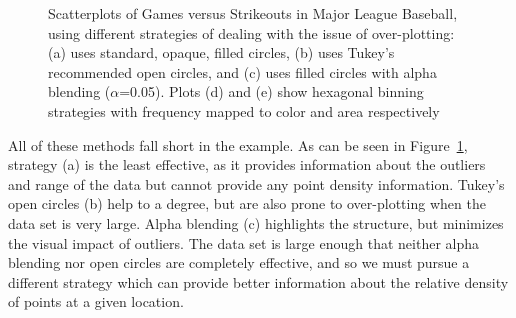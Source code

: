 \begin{figure}[hbtp]

	\caption{\label{fig:scatter-alpha} Scatterplots of Games versus Strikeouts in Major League Baseball, using different strategies of dealing with the issue of over-plotting:  (a) uses standard, opaque, filled circles, (b)  uses Tukey's recommended open circles, and (c) uses filled circles with alpha blending ($\alpha$=0.05). Plots (d) and (e) show hexagonal binning strategies with frequency mapped to color and area respectively}
\end{figure}

All of these methods fall short in the example.
As can be seen in Figure~\ref{fig:scatter-alpha}, strategy (a) is the least effective, as it provides information about the outliers and range of the data but cannot provide any point density information. Tukey's open circles (b) help to a degree, but are also prone to over-plotting  when the data set is very large. Alpha blending (c) highlights the structure, but minimizes the visual impact of outliers. The data set is large enough that neither alpha blending nor open circles are completely effective, and so we must pursue a different strategy which can provide better information about the relative density of points at a given location.

